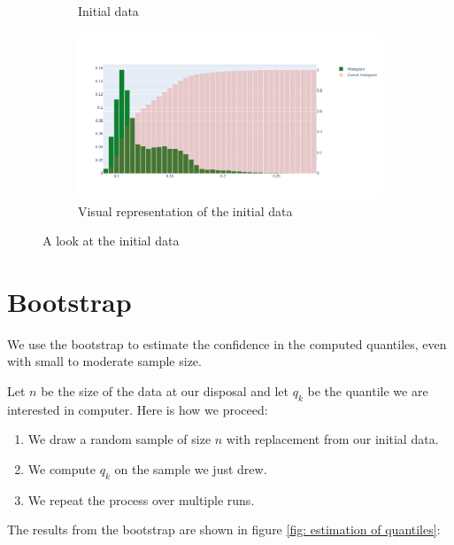 \documentclass{article}
\begin{document}
\begin{figure}[H]
\begin{subfigure}{.25\textwidth}
        \caption{Initial data}
        \label{fig: initial data}
    \end{subfigure}
    \hfill
    \begin{subfigure}{.74\textwidth}
        \centering
        \includegraphics[width=\textwidth]{images/plot_excel_data.png}
        \caption{Visual representation of the initial data}
        \label{fig: visual representation of the initial data}
    \end{subfigure}
    \caption{A look at the initial data}
\end{figure}

\section{Bootstrap}
\label{section: bootstrap}
We use the bootstrap to estimate the confidence in the computed quantiles, even with small to moderate sample size.

Let \(n\) be the size of the data at our disposal and let \(q_k\) be the quantile we are interested in computer. Here is how we proceed:
\begin{enumerate}
    \item We draw a random sample of size \(n\) with replacement from our initial data.
    \item We compute \(q_k\) on the sample we just drew.
    \item We repeat the process over multiple runs.
\end{enumerate}
The results from the bootstrap are shown in figure \ref{fig: estimation of quantiles}:
\end{document}
